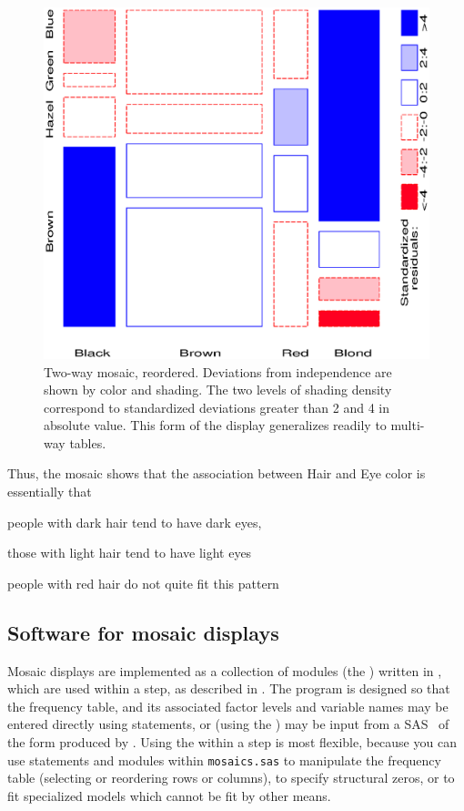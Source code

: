 \begin{figure}[htb]
  \centering
  \includegraphics[scale=.6]{ch4/fig/mosaic34}
  \caption[Two-way mosaic, reordered]{Two-way mosaic,
  reordered.  Deviations from independence are shown by
  color and shading.  The two levels of shading density correspond to
  standardized deviations greater than 2 and 4 in absolute value.
  This form of the display generalizes readily to multi-way
  tables.}  \label{fig:mosaic34}
\end{figure}
Thus, the mosaic shows that the association between Hair and Eye color
is essentially that 
\begin{itemize*}
\item people with dark hair tend to have dark eyes,
\item those with light hair tend to have light eyes
\item people with red hair do not quite fit this pattern
\end{itemize*}

\subsection{Software for mosaic displays}
Mosaic displays are implemented as a collection of modules
(the ) written in \IML{},
which are used within a  step,
as described in .  The program is designed so that
the frequency table, and its associated factor levels and variable names
may be entered directly using \IML{} statements,
or (using the ) may be input from a SAS \Dset\
of the form produced by .
Using the  within a  step is most
flexible, because you can use \IML{} statements and modules within
\texttt{mosaics.sas} to manipulate the frequency table (selecting
or reordering rows or columns), to specify structural zeros,
or to fit specialized models which cannot be fit by other means.

